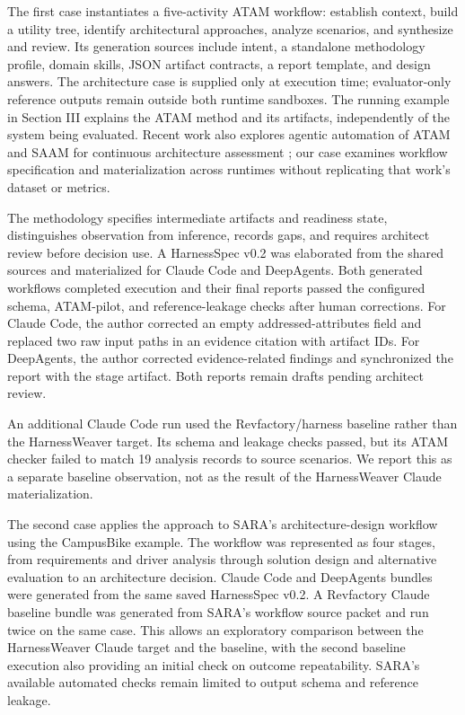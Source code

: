 \documentclass[10pt,conference]{IEEEtran}
\begin{document}
The first case instantiates a five-activity ATAM workflow: establish context, build a utility tree, identify architectural approaches, analyze scenarios, and synthesize and review. Its generation sources include intent, a standalone methodology profile, domain skills, JSON artifact contracts, a report template, and design answers. The architecture case is supplied only at execution time; evaluator-only reference outputs remain outside both runtime sandboxes. The running example in Section III explains the ATAM method and its artifacts, independently of the system being evaluated. Recent work also explores agentic automation of ATAM and SAAM for continuous architecture assessment \cite{atamagents}; our case examines workflow specification and materialization across runtimes without replicating that work's dataset or metrics.

The methodology specifies intermediate artifacts and readiness state, distinguishes observation from inference, records gaps, and requires architect review before decision use. A HarnessSpec v0.2 was elaborated from the shared sources and materialized for Claude Code and DeepAgents. Both generated workflows completed execution and their final reports passed the configured schema, ATAM-pilot, and reference-leakage checks after human corrections. For Claude Code, the author corrected an empty addressed-attributes field and replaced two raw input paths in an evidence citation with artifact IDs. For DeepAgents, the author corrected evidence-related findings and synchronized the report with the stage artifact. Both reports remain drafts pending architect review.

An additional Claude Code run used the Revfactory/harness baseline rather than the HarnessWeaver target. Its schema and leakage checks passed, but its ATAM checker failed to match 19 analysis records to source scenarios. We report this as a separate baseline observation, not as the result of the HarnessWeaver Claude materialization.

The second case applies the approach to SARA's architecture-design workflow using the CampusBike example. The workflow was represented as four stages, from requirements and driver analysis through solution design and alternative evaluation to an architecture decision. Claude Code and DeepAgents bundles were generated from the same saved HarnessSpec v0.2. A Revfactory Claude baseline bundle was generated from SARA's workflow source packet and run twice on the same case. This allows an exploratory comparison between the HarnessWeaver Claude target and the baseline, with the second baseline execution also providing an initial check on outcome repeatability. SARA's available automated checks remain limited to output schema and reference leakage.
\end{document}

